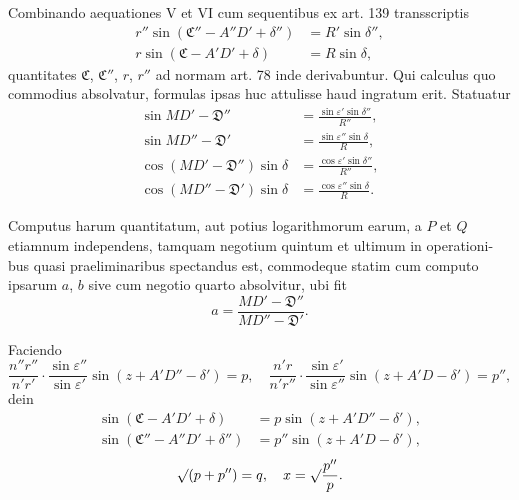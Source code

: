 \documentclass[12pt,a4paper]{article}
\begin{document}
Combinando aequationes V et VI cum sequentibus ex art. 139 transscriptis
\begin{align}
r''\sin(\mathfrak{C}'' - A''D' + \delta'') &= R'\sin\delta'', \tag{VIII} \\
r\sin(\mathfrak{C} - A'D' + \delta) &= R\sin\delta, \tag{IX}
\end{align}
quantitates $\mathfrak{C}$, $\mathfrak{C}''$, $r$, $r''$ ad normam art. 78 inde derivabuntur. Qui calculus
quo commodius absolvatur, formulas ipsas huc attulisse haud ingratum erit.
Statuatur
\begin{align*}
\sin MD' - \mathfrak{D}'' &= \frac{\sin\varepsilon'\sin\delta''}{R''}, \\
\sin MD'' - \mathfrak{D}' &= \frac{\sin\varepsilon''\sin\delta}{R}, \\
\cos(MD' - \mathfrak{D}'')\sin\delta &= \frac{\cos\varepsilon'\sin\delta''}{R''}, \\
\cos(MD'' - \mathfrak{D}')\sin\delta &= \frac{\cos\varepsilon''\sin\delta}{R}.
\end{align*}

Computus harum quantitatum, aut potius logarithmorum earum, a $P$ et $Q$
etiamnum independens, tamquam negotium quintum et ultimum in operationi-
bus quasi praeliminaribus spectandus est, commodeque statim cum computo
ipsarum $a$, $b$ sive cum negotio quarto absolvitur, ubi fit
\[
a = \frac{MD' - \mathfrak{D}''}{MD'' - \mathfrak{D}'}.
\]

Faciendo
\[
\frac{n''r''}{n'r'} \cdot \frac{\sin\varepsilon''}{\sin\varepsilon'} \sin(z + A'D'' - \delta') = p, \quad
\frac{n'r}{n'r''} \cdot \frac{\sin\varepsilon'}{\sin\varepsilon''} \sin(z + A'D - \delta') = p'',
\]
dein
\begin{align*}
\sin(\mathfrak{C} - A'D' + \delta) &= p\sin(z + A'D'' - \delta'), \\
\sin(\mathfrak{C}'' - A''D' + \delta'') &= p''\sin(z + A'D - \delta'),
\end{align*}
\[
\surd(p + p'') = q, \quad x = \surd\frac{p''}{p}.
\]
\end{document}
